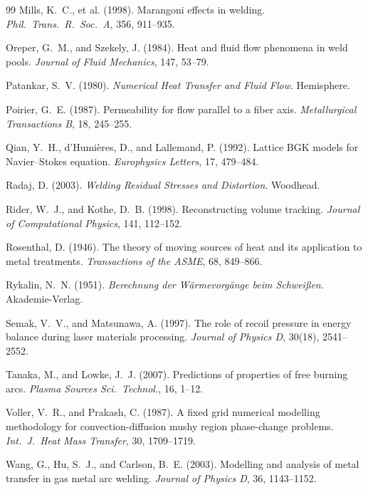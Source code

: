 \documentclass[11pt,a4paper]{article}
\begin{document}
\begin{thebibliography}{99}
Mills, K.~C., et al. (1998).
Marangoni effects in welding.
\textit{Phil.\ Trans.\ R.\ Soc.\ A}, 356, 911--935.

Oreper, G.~M., and Szekely, J. (1984).
Heat and fluid flow phenomena in weld pools.
\textit{Journal of Fluid Mechanics}, 147, 53--79.

Patankar, S.~V. (1980).
\textit{Numerical Heat Transfer and Fluid Flow}. Hemisphere.

Poirier, G.~E. (1987).
Permeability for flow parallel to a fiber axis.
\textit{Metallurgical Transactions B}, 18, 245--255.

Qian, Y.~H., d'Humi\`eres, D., and Lallemand, P. (1992).
Lattice BGK models for Navier--Stokes equation.
\textit{Europhysics Letters}, 17, 479--484.

Radaj, D. (2003).
\textit{Welding Residual Stresses and Distortion}. Woodhead.

Rider, W.~J., and Kothe, D.~B. (1998).
Reconstructing volume tracking.
\textit{Journal of Computational Physics}, 141, 112--152.

Rosenthal, D. (1946).
The theory of moving sources of heat and its application to metal treatments.
\textit{Transactions of the ASME}, 68, 849--866.

Rykalin, N.~N. (1951).
\textit{Berechnung der W\"armevorg\"ange beim Schwei{\ss}en}. Akademie-Verlag.

Semak, V.~V., and Matsunawa, A. (1997).
The role of recoil pressure in energy balance during laser materials processing.
\textit{Journal of Physics D}, 30(18), 2541--2552.

Tanaka, M., and Lowke, J.~J. (2007).
Predictions of properties of free burning arcs.
\textit{Plasma Sources Sci.\ Technol.}, 16, 1--12.

Voller, V.~R., and Prakash, C. (1987).
A fixed grid numerical modelling methodology for convection-diffusion mushy region phase-change problems.
\textit{Int.\ J.\ Heat Mass Transfer}, 30, 1709--1719.

Wang, G., Hu, S.~J., and Carlson, B.~E. (2003).
Modelling and analysis of metal transfer in gas metal arc welding.
\textit{Journal of Physics D}, 36, 1143--1152.

\end{thebibliography}
\end{document}
